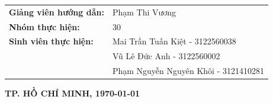 {\begin{titlepage}
\begin{center}
            \begin{flushleft}
                \hspace{2.5cm}
                \begin{tabular}{ll}
                    \textbf{Giảng viên hướng dẫn:} & Phạm Thi Vương \\[0.4cm]
                    \textbf{Nhóm thực hiện:}       & 30 \\[0.4cm]
                    \textbf{Sinh viên thực hiện:}  & Mai Trần Tuấn Kiệt - 3122560038 \\[0.2cm]
                                                   & Vũ Lê Đức Anh - 3122560002 \\[0.2cm]
                                                   & Phạm Nguyễn Nguyên Khôi - 3121410281 \\[0.4cm]
                \end{tabular}
            \end{flushleft}

            \vfill

            {\large\bfseries TP. HỒ CHÍ MINH, \today}
        \end{center}

        \restoregeometry
    \end{titlepage}

    \newpage
    \thispagestyle{empty}
    \mbox{}
}
